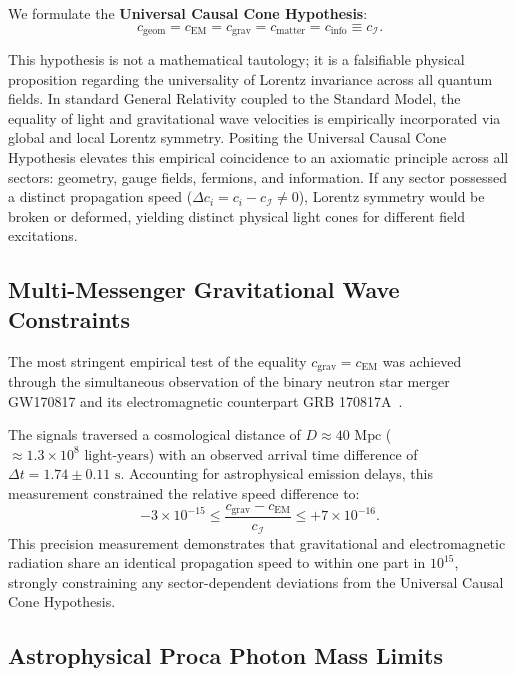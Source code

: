 \documentclass[11pt,a4paper]{article}
\begin{document}
We formulate the \textbf{Universal Causal Cone Hypothesis}:
\begin{equation}
\boxed{c_{\text{geom}} = c_{\text{EM}} = c_{\text{grav}} = c_{\text{matter}} = c_{\text{info}} \equiv c_{\mathcal{I}}.}
\end{equation}

This hypothesis is not a mathematical tautology; it is a falsifiable physical proposition regarding the universality of Lorentz invariance across all quantum fields. In standard General Relativity coupled to the Standard Model, the equality of light and gravitational wave velocities is empirically incorporated via global and local Lorentz symmetry. Positing the Universal Causal Cone Hypothesis elevates this empirical coincidence to an axiomatic principle across all sectors: geometry, gauge fields, fermions, and information. If any sector possessed a distinct propagation speed ($\Delta c_i = c_i - c_{\mathcal{I}} \neq 0$), Lorentz symmetry would be broken or deformed, yielding distinct physical light cones for different field excitations.

\subsection{Multi-Messenger Gravitational Wave Constraints}

The most stringent empirical test of the equality $c_{\text{grav}} = c_{\text{EM}}$ was achieved through the simultaneous observation of the binary neutron star merger GW170817 and its electromagnetic counterpart GRB 170817A~\cite{abbott2017}. 

The signals traversed a cosmological distance of $D \approx 40\text{ Mpc}$ ($\approx 1.3 \times 10^8\text{ light-years}$) with an observed arrival time difference of $\Delta t = 1.74 \pm 0.11\text{ s}$. Accounting for astrophysical emission delays, this measurement constrained the relative speed difference to:
\begin{equation}
-3 \times 10^{-15} \le \frac{c_{\text{grav}} - c_{\text{EM}}}{c_{\mathcal{I}}} \le +7 \times 10^{-16}.
\end{equation}
This precision measurement demonstrates that gravitational and electromagnetic radiation share an identical propagation speed to within one part in $10^{15}$, strongly constraining any sector-dependent deviations from the Universal Causal Cone Hypothesis.

\subsection{Astrophysical Proca Photon Mass Limits}
\end{document}
